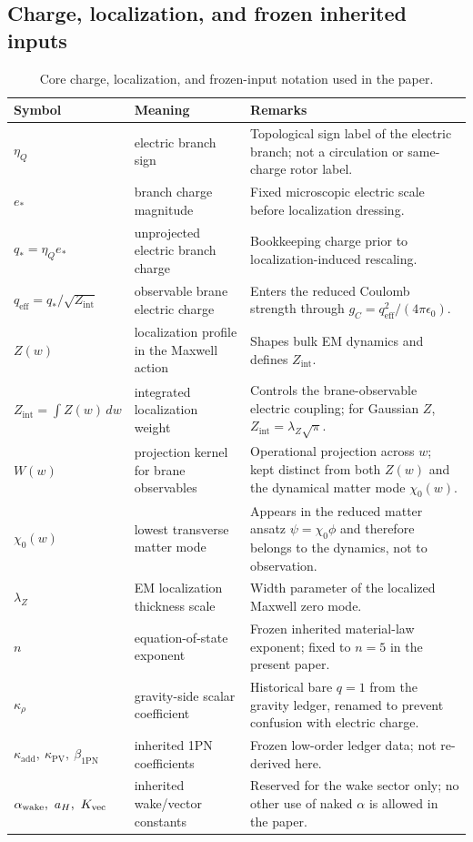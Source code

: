 \documentclass[11pt]{article}
\theoremstyle{plain}
\theoremstyle{definition}
\theoremstyle{remark}
\newcommand{\qeff}{q_{\mathrm{eff}}}
\newcommand{\qstar}{q_*}
\newcommand{\Zint}{Z_{\mathrm{int}}}
\newcommand{\alphawake}{\alpha_{\mathrm{wake}}}
\newcommand{\betapn}{\beta_{\mathrm{1PN}}}
\newcommand{\kappaadd}{\kappa_{\mathrm{add}}}
\newcommand{\kappapv}{\kappa_{\mathrm{PV}}}
\newcommand{\kapparho}{\kappa_{\rho}}
\begin{document}
\subsection{Charge, localization, and frozen inherited inputs}\label{subsec:notation-ledger-core}

\begin{table}[t]
\centering
\caption{Core charge, localization, and frozen-input notation used in the paper.}
\label{tab:notation-ledger-core}
\begin{tabularx}{\textwidth}{@{}>{\raggedright\arraybackslash}p{} >{\raggedright\arraybackslash}p{} X@{}}
\toprule
Symbol & Meaning & Remarks \\
\midrule
$\eta_Q$ & electric branch sign & Topological sign label of the electric branch; not a circulation or same-charge rotor label. \\
$e_*$ & branch charge magnitude & Fixed microscopic electric scale before localization dressing. \\
$\qstar=\eta_Q e_*$ & unprojected electric branch charge & Bookkeeping charge prior to localization-induced rescaling. \\
$\qeff=\qstar/\sqrt{\Zint}$ & observable brane electric charge & Enters the reduced Coulomb strength through $g_C=\qeff^2/(4\pi\epsilon_0)$. \\
$Z(w)$ & localization profile in the Maxwell action & Shapes bulk EM dynamics and defines $\Zint$. \\
$\Zint=\int Z(w)\,dw$ & integrated localization weight & Controls the brane-observable electric coupling; for Gaussian $Z$, $\Zint=\lambda_Z\sqrt\pi$. \\
$W(w)$ & projection kernel for brane observables & Operational projection across $w$; kept distinct from both $Z(w)$ and the dynamical matter mode $\chi_0(w)$. \\
$\chi_0(w)$ & lowest transverse matter mode & Appears in the reduced matter ansatz $\psi=\chi_0\phi$ and therefore belongs to the dynamics, not to observation. \\
$\lambda_Z$ & EM localization thickness scale & Width parameter of the localized Maxwell zero mode. \\
$n$ & equation-of-state exponent & Frozen inherited material-law exponent; fixed to $n=5$ in the present paper. \\
$\kapparho$ & gravity-side scalar coefficient & Historical bare $q=1$ from the gravity ledger, renamed to prevent confusion with electric charge. \\
$\kappaadd,\ \kappapv,\ \betapn$ & inherited 1PN coefficients & Frozen low-order ledger data; not re-derived here. \\
$\alphawake,\ a_H,\ K_{\rm vec}$ & inherited wake/vector constants & Reserved for the wake sector only; no other use of naked $\alpha$ is allowed in the paper. \\
\bottomrule
\end{tabularx}
\end{table}
\end{document}
